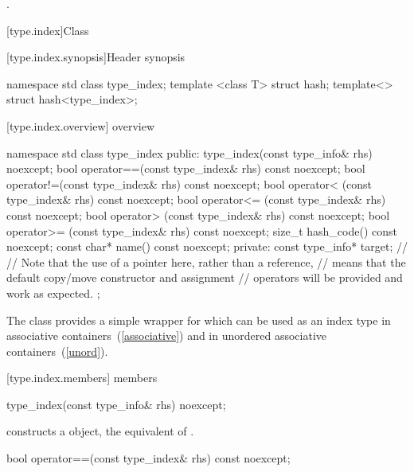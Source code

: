 \begin{itemdescr}
\pnum
\returns {}.
\end{itemdescr}

[type.index]{Class }

%
[type.index.synopsis]{Header  synopsis}

\begin{codeblock}
namespace std {
  class type_index;
  template <class T> struct hash;
  template<> struct hash<type_index>;
}
\end{codeblock}

[type.index.overview]{ overview}

\begin{codeblock}
namespace std {
  class type_index {
  public:
    type_index(const type_info& rhs) noexcept;
    bool operator==(const type_index& rhs) const noexcept;
    bool operator!=(const type_index& rhs) const noexcept;
    bool operator< (const type_index& rhs) const noexcept;
    bool operator<= (const type_index& rhs) const noexcept;
    bool operator> (const type_index& rhs) const noexcept;
    bool operator>= (const type_index& rhs) const noexcept;
    size_t hash_code() const noexcept;
    const char* name() const noexcept;
  private:
    const type_info* target;    // \expos
    // Note that the use of a pointer here, rather than a reference,
    // means that the default copy/move constructor and assignment
    // operators will be provided and work as expected.
  };
}
\end{codeblock}

\pnum
The class  provides a simple wrapper for
 which can be used as an index type in associative
containers~(\ref{associative}) and in unordered associative
containers~(\ref{unord}).

[type.index.members]{ members}

%
\begin{itemdecl}
type_index(const type_info& rhs) noexcept;
\end{itemdecl}

\begin{itemdescr}
\pnum
\effects constructs a  object, the equivalent of .
\end{itemdescr}

%
%
\begin{itemdecl}
bool operator==(const type_index& rhs) const noexcept;
\end{itemdecl}

